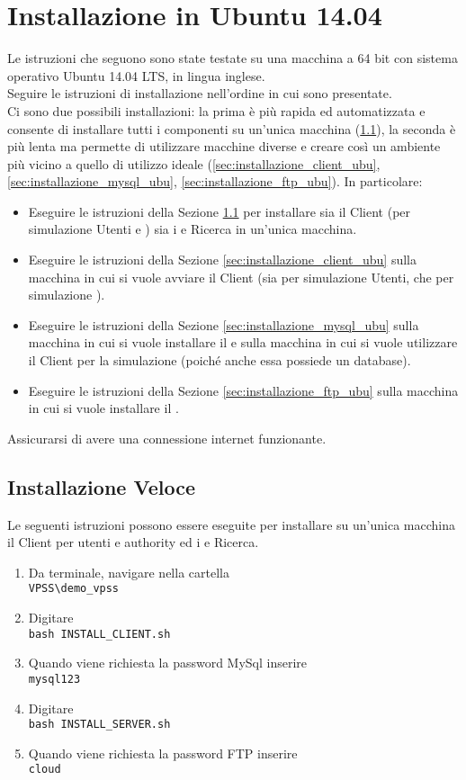 \documentclass[a4paper,twoside,10pt,openany]{scrbook}
\begin{document}
\section{Installazione in Ubuntu 14.04}
%
Le istruzioni che seguono sono state testate su una macchina a 64 bit con sistema operativo Ubuntu 14.04 LTS, in lingua inglese.\\
Seguire le istruzioni di installazione nell'ordine in cui sono presentate.\\
Ci sono due possibili installazioni: la prima è più rapida ed automatizzata e consente di installare tutti i componenti su un'unica macchina (\ref{sec:installazione_veloce_ubu}), la seconda è più lenta ma permette di utilizzare macchine diverse e creare così un ambiente più vicino a quello di utilizzo ideale (\ref{sec:installazione_client_ubu}, \ref{sec:installazione_mysql_ubu}, \ref{sec:installazione_ftp_ubu}). In particolare:
\begin{itemize}
 \item Eseguire le istruzioni della Sezione \ref{sec:installazione_veloce_ubu} per installare sia il Client (per simulazione Utenti e \auth) sia i \sa e Ricerca in un'unica macchina.
 \item Eseguire le istruzioni della Sezione \ref{sec:installazione_client_ubu} sulla macchina in cui si vuole avviare il Client (sia per simulazione Utenti, che per simulazione \auth).
 \item Eseguire le istruzioni della Sezione \ref{sec:installazione_mysql_ubu} sulla macchina in cui si vuole installare il \sr e sulla macchina in cui si vuole utilizzare il Client per la simulazione \auth (poiché anche essa possiede un database).
 \item Eseguire le istruzioni della Sezione \ref{sec:installazione_ftp_ubu} sulla macchina in cui si vuole installare il \sa.\\
\end{itemize}
Assicurarsi di avere una connessione internet funzionante.
%
\subsection{Installazione Veloce}\label{sec:installazione_veloce_ubu}
%
Le seguenti istruzioni possono essere eseguite per installare su un'unica macchina il Client per utenti e authority ed i \sa e Ricerca.
\begin{enumerate} 
 \item Da terminale, navigare nella cartella\\
       \texttt{VPSS\textbackslash demo\_vpss}
 \item Digitare\\
       \texttt{bash INSTALL\_CLIENT.sh}
 \item Quando viene richiesta la password MySql inserire\\
       \texttt{mysql123}
 \item Digitare\\
       \texttt{bash INSTALL\_SERVER.sh}
 \item Quando viene richiesta la password FTP inserire\\
       \texttt{cloud}
\end{enumerate}
%
\end{document}
